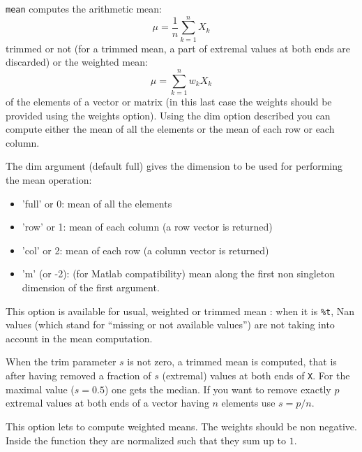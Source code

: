 \begin{mandescription}
  \verb+mean+ computes the arithmetic mean:
$$
    \mu = \frac{1}{n} \sum_{k=1}^n X_k 
$$ 
trimmed or not (for a trimmed mean, a part of extremal values at both ends are discarded) 
or the weighted mean:
$$
    \mu = \sum_{k=1}^n w_k X_k 
$$
of the elements of a vector or matrix (in this last case the weights should be provided
using the weights option). Using the dim option described you can compute either
the mean of all the elements or the mean of each row or each column. 

  The dim argument (default full) gives the dimension to be used for performing the mean operation:
  \begin{itemize}
    \item 'full' or 0: mean of all the elements 
    \item 'row' or 1: mean of each column (a row vector is returned)
    \item 'col' or 2: mean of each row (a column vector is returned)
    \item 'm' (or -2): (for Matlab compatibility) mean along the first non 
          singleton dimension of the first argument.
  \end{itemize}

   This option is available for usual, weighted or trimmed mean : when it is \verb+%t+,  Nan values 
  (which stand for ``missing or not available values'') are not taking into account in the
   mean computation.

  When the trim parameter $s$ is not zero, a trimmed mean is computed, that is
  after having removed a fraction of $s$ (extremal) values at both ends of \verb+X+. For
  the maximal value ($s=0.5$) one gets the median. If you want to remove exactly $p$
  extremal values at both ends of a vector having $n$ elements use $s = p/n$.  
   
  This option lets to compute weighted means. The weights should be non negative. Inside
the function they are normalized such that they sum up to $1$.

\end{mandescription}
